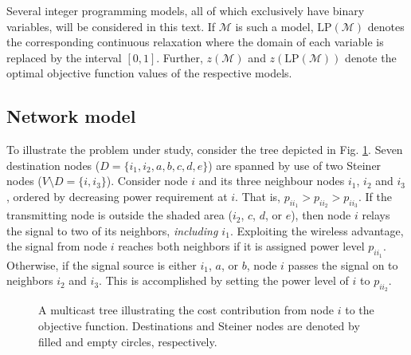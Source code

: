 Several integer programming models, all of which exclusively have binary variables, will be considered in this text.
If $\mathcal{M}$ is such a model, $\text{LP}(\mathcal{M})$ denotes the corresponding continuous relaxation
where the domain of each variable is replaced by the interval $[0,1]$.
Further, $z\left(\mathcal{M}\right)$ and $z\left(\text{LP}(\mathcal{M})\right)$ denote the optimal objective function values of the respective models.


\subsection{Network model} \label{sec:netmod}

To illustrate the problem under study, consider the tree depicted in Fig. \ref{fig:objexp}.
Seven destination nodes ($D=\{i_1,i_2,a,b,c,d,e\}$) are spanned by use of two Steiner nodes ($V\setminus D = \{i,i_3\}$).
Consider node $i$ and its three neighbour nodes $i_1$, $i_2$ and $i_3$, ordered by decreasing power requirement at $i$.
That is, $p_{ii_1}>p_{ii_2}>p_{ii_3}$.
If the transmitting node is outside the shaded area ($i_2$, $c$, $d$, or $e$), then node $i$ relays the signal to two of its neighbors, \emph{including $i_1$}.
Exploiting the wireless advantage, the signal from node $i$ reaches both neighbors if it is assigned power level $p_{ii_1}$.
Otherwise, if the signal source is either $i_1$, $a$, or $b$, node $i$ passes the signal on to neighbors $i_2$ and $i_3$.
This is accomplished by setting the power level of $i$ to $p_{ii_2}$.

\begin{figure}[h!]
\centering
{}
\caption{A multicast tree illustrating the cost contribution from node $i$ to the objective function.
	 Destinations and Steiner nodes are denoted by filled and empty circles, respectively.}
\label{fig:objexp}
\end{figure}

